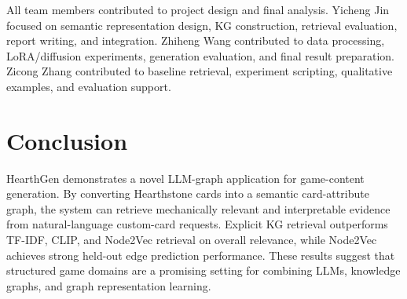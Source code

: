 \documentclass{article}
\begin{document}
All team members contributed to project design and final analysis. Yicheng Jin focused on semantic representation design, KG construction, retrieval evaluation, report writing, and integration. Zhiheng Wang contributed to data processing, LoRA/diffusion experiments, generation evaluation, and final result preparation. Zicong Zhang contributed to baseline retrieval, experiment scripting, qualitative examples, and evaluation support.

\section{Conclusion}

HearthGen demonstrates a novel LLM-graph application for game-content generation. By converting Hearthstone cards into a semantic card-attribute graph, the system can retrieve mechanically relevant and interpretable evidence from natural-language custom-card requests. Explicit KG retrieval outperforms TF-IDF, CLIP, and Node2Vec retrieval on overall relevance, while Node2Vec achieves strong held-out edge prediction performance. These results suggest that structured game domains are a promising setting for combining LLMs, knowledge graphs, and graph representation learning.



\end{document}
